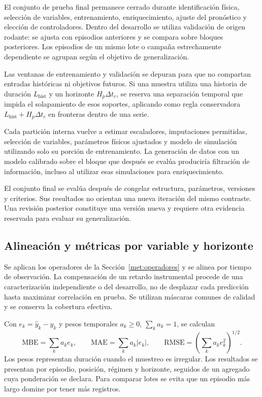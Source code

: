 El conjunto de prueba final permanece cerrado durante identificación física, selección de variables, entrenamiento, enriquecimiento, ajuste del pronóstico y elección de controladores. Dentro del desarrollo se utiliza validación de origen rodante: se ajusta con episodios anteriores y se compara sobre bloques posteriores. Los episodios de un mismo lote o campaña estrechamente dependiente se agrupan según el objetivo de generalización.

Las ventanas de entrenamiento y validación se depuran para que no compartan entradas históricas ni objetivos futuros. Si una muestra utiliza una historia de duración $L_{\mathrm{hist}}$ y un horizonte $H_p\Delta t_c$, se reserva una separación temporal que impida el solapamiento de esos soportes, aplicando como regla conservadora $L_{\mathrm{hist}}+H_p\Delta t_c$ en fronteras dentro de una serie.

Cada partición interna vuelve a estimar escaladores, imputaciones permitidas, selección de variables, parámetros físicos ajustados y modelo de simulación utilizando solo su porción de entrenamiento. La generación de datos con un modelo calibrado sobre el bloque que después se evalúa produciría filtración de información, incluso al utilizar esas simulaciones para enriquecimiento.

El conjunto final se evalúa después de congelar estructura, parámetros, versiones y criterios. Sus resultados no orientan una nueva iteración del mismo contraste. Una revisión posterior constituye una versión nueva y requiere otra evidencia reservada para evaluar su generalización.

\subsection{Alineación y métricas por variable y horizonte}
\label{met:metricas}

Se aplican los operadores de la Sección~\ref{met:operadores} y se alinea por tiempo de observación. La compensación de un retardo instrumental procede de una caracterización independiente o del desarrollo, no de desplazar cada predicción hasta maximizar correlación en prueba. Se utilizan máscaras comunes de calidad y se conserva la cobertura efectiva.

Con $e_k=\widehat y_k-y_k$ y pesos temporales $a_k\geq0$, $\sum_k a_k=1$, se calculan
\begin{equation}
\mathrm{MBE}=\sum_k a_ke_k,\qquad
\mathrm{MAE}=\sum_k a_k|e_k|,\qquad
\mathrm{RMSE}=\left(\sum_k a_ke_k^2\right)^{1/2}.
\label{met:errores}
\end{equation}
Los pesos representan duración cuando el muestreo es irregular. Los resultados se presentan por episodio, posición, régimen y horizonte, seguidos de un agregado cuya ponderación se declara. Para comparar lotes se evita que un episodio más largo domine por tener más registros.

